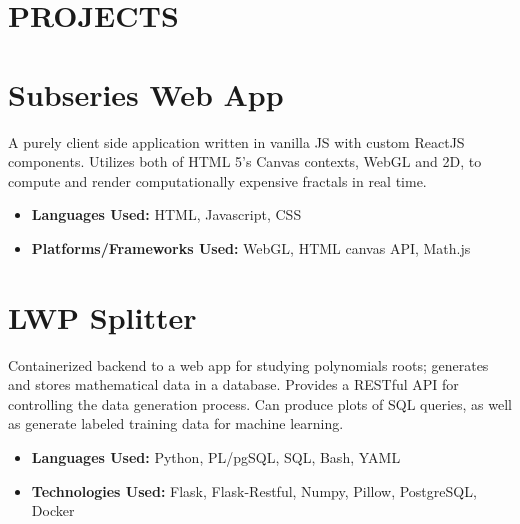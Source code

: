 \documentclass[margin]{../res}
\begin{document}
  

\address{Email: raphaelreyna@protonmail.com \\
  Phone: (626) 384-1342 \\
  Site: www.raphaelreyna.works}
                           
                        
\begin{resume} 
\section{PROJECTS}
  
\normalsize{\section{Subseries Web App}}
A purely client side application written in vanilla JS with custom ReactJS components.
Utilizes both of HTML 5's Canvas contexts, WebGL and 2D, to compute and render computationally expensive fractals in real
time.
\begin{multicols}{2}
\begin{itemize}
\item {\bf Languages Used: }\newline HTML, Javascript, CSS
  \columnbreak
\item {\bf Platforms/Frameworks Used: }\newline WebGL, HTML canvas API, Math.js
\end{itemize}
\end{multicols}

\normalsize{\section{LWP Splitter}}
Containerized backend to a web app for studying polynomials roots;
generates and stores mathematical data in a database.
Provides a RESTful API for controlling the data generation process.
Can produce plots of SQL queries, as well as generate labeled training data for machine learning.
\begin{multicols}{2}
\begin{itemize}
\item {\bf Languages Used: }\newline
  Python, PL/pgSQL, SQL, Bash, YAML
  \columnbreak
\item {\bf Technologies Used: } \newline
  Flask, Flask-Restful, Numpy, Pillow, PostgreSQL, Docker
\end{itemize}
\end{multicols}


\end{resume}
\end{document}
